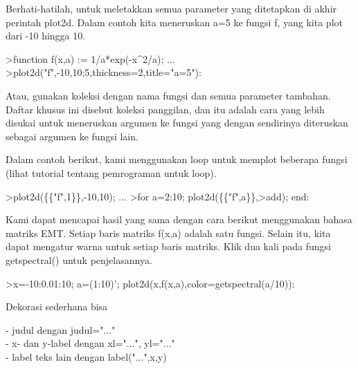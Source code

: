 \documentclass[a4paper,10pt]{article}
\begin{document}
\begin{eulernotebook}
\begin{eulercomment}
\begin{eulercomment}
\begin{eulercomment}
\begin{eulercomment}
\begin{eulercomment}
\begin{eulercomment}
\begin{eulercomment}
\begin{eulercomment}
\begin{eulercomment}
Berhati-hatilah, untuk meletakkan semua parameter yang ditetapkan di
akhir perintah plot2d. Dalam contoh kita meneruskan a=5 ke fungsi f,
yang kita plot dari -10 hingga 10.
\end{eulercomment}
\begin{eulerprompt}
>function f(x,a) := 1/a*exp(-x^2/a); ...
>plot2d("f",-10,10;5,thickness=2,title="a=5"):
\end{eulerprompt}
\begin{eulercomment}
Atau, gunakan koleksi dengan nama fungsi dan semua parameter tambahan.
Daftar khusus ini disebut koleksi panggilan, dan itu adalah cara yang
lebih disukai untuk meneruskan argumen ke fungsi yang dengan
sendirinya diteruskan sebagai argumen ke fungsi lain.

Dalam contoh berikut, kami menggunakan loop untuk memplot beberapa
fungsi (lihat tutorial tentang pemrograman untuk loop).
\end{eulercomment}
\begin{eulerprompt}
>plot2d(\{\{"f",1\}\},-10,10); ...
>for a=2:10; plot2d(\{\{"f",a\}\},>add); end:
\end{eulerprompt}
\begin{eulercomment}
Kami dapat mencapai hasil yang sama dengan cara berikut menggunakan
bahasa matriks EMT. Setiap baris matriks f(x,a) adalah satu fungsi.
Selain itu, kita dapat mengatur warna untuk setiap baris matriks. Klik
dua kali pada fungsi getspectral() untuk penjelasannya.
\end{eulercomment}
\begin{eulerprompt}
>x=-10:0.01:10; a=(1:10)'; plot2d(x,f(x,a),color=getspectral(a/10)):
\end{eulerprompt}
\begin{eulercomment}
Dekorasi sederhana bisa

- judul dengan judul="..."\\
- x- dan y-label dengan xl="...", yl="..."\\
- label teks lain dengan label("...",x,y)


\end{eulercomment}
\end{eulercomment}
\end{eulercomment}
\end{eulercomment}
\end{eulercomment}
\end{eulercomment}
\end{eulercomment}
\end{eulercomment}
\end{eulercomment}
\end{eulernotebook}
\end{document}
